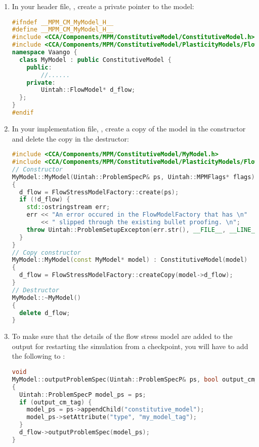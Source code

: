 \begin{enumerate}
  \item In your header file, , create a private pointer to the
        model:
\begin{lstlisting}[language=Cpp]
#ifndef __MPM_CM_MyModel_H__
#define __MPM_CM_MyModel_H__
#include <CCA/Components/MPM/ConstitutiveModel/ConstitutiveModel.h>
#include <CCA/Components/MPM/ConstitutiveModel/PlasticityModels/FlowModel.h>
namespace Vaango {
  class MyModel : public ConstitutiveModel {
    public:
        //......
    private:
        Uintah::FlowModel* d_flow;  
  };
}
#endif
\end{lstlisting}

  \item In your implementation file, , create a copy of the
        model in the constructor and delete the copy in the destructor:
\begin{lstlisting}[language=Cpp]
#include <CCA/Components/MPM/ConstitutiveModel/MyModel.h>
#include <CCA/Components/MPM/ConstitutiveModel/PlasticityModels/FlowStressModelFactory.h>
// Constructor
MyModel::MyModel(Uintah::ProblemSpecP& ps, Uintah::MPMFlags* flags) : ConstitutiveModel(flags)
{
  d_flow = FlowStressModelFactory::create(ps);
  if (!d_flow) {
    std::ostringstream err;
    err << "An error occured in the FlowModelFactory that has \n"
        << " slipped through the existing bullet proofing. \n";
    throw Uintah::ProblemSetupExcepton(err.str(), __FILE__, __LINE__);
  }
}
// Copy constructor
MyModel::MyModel(const MyModel* model) : ConstitutiveModel(model)
{
  d_flow = FlowStressModelFactory::createCopy(model->d_flow);
}
// Destructor
MyModel::~MyModel()
{
  delete d_flow;
}
\end{lstlisting}

  \item To make sure that the details of the flow stress model are added to the output for
        restarting the simulation from a checkpoint, you will have to add the
        following to :
\begin{lstlisting}[language=Cpp]
void
MyModel::outputProblemSpec(Uintah::ProblemSpecP& ps, bool output_cm_tag)
{
  Uintah::ProblemSpecP model_ps = ps;
  if (output_cm_tag) {
    model_ps = ps->appendChild("constitutive_model");
    model_ps->setAttribute("type", "my_model_tag");
  }
  d_flow->outputProblemSpec(model_ps);
}
\end{lstlisting}


\end{enumerate}
